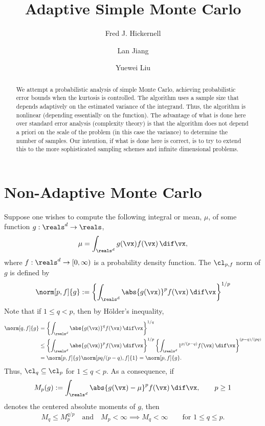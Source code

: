 \documentclass[12pt]{amsart}
\begin{document}
\title{Adaptive Simple Monte Carlo}
\author{Fred J. Hickernell}
\author{Lan Jiang}
\author{Yuewei Liu}
\begin{abstract}We attempt a probabilistic analysis of simple Monte Carlo, achieving probabilistic error bounds when the kurtosis is controlled.  The algorithm uses a sample size that depends adaptively on the estimated variance of the integrand.  Thus, the algorithm is nonlinear (depending essentially on the function).  The advantage of what is done here over standard error analysis (complexity theory) is that the algorithm does not depend a priori on the scale of the problem (in this case the variance) to determine the number of samples.   Our intention, if what is done here is correct, is to try to extend this to the more sophisticated sampling schemes and infinite dimensional problems.
\end{abstract}
\maketitle

\section{Non-Adaptive Monte Carlo}
Suppose one wishes to compute the following integral or mean, $\mu$, of some function $g: \reals^d \to \reals$,
\begin{equation*}
\mu= \int_{\reals^d} g(\vx) f(\vx) \, \dif \vx,
\end{equation*}
where $f: \reals^d \to [0,\infty)$ is a probability density function.  The $\cl_{p,f}$ norm of $g$ is defined by
\[
\norm[p,f]{g} :=\left\{\int_{\reals^d} \abs{g(\vx)}^p f(\vx) \, \dif \vx\right\}^{1/p}
\]
Note that if $1 \le q<p$, then by H\"older's inequality,
\begin{align}\label{LP}
\norm[q,f]{g} &=\left\{\int_{\reals^d} \abs{g(\vx)}^q f(\vx) \, \dif \vx\right\}^{1/q}\\
\nonumber & \le \left\{\int_{\reals^d} \abs{g(\vx)}^p f(\vx) \, \dif \vx \right\}^{1/p} \left\{\int_{\reals^d} 1^{p/(p-q)} f(\vx) \, \dif \vx\right\}^{(p-q)/(pq)} \\
\nonumber & = \norm[p,f]{g} \norm[pq/(p-q),f]{1} = \norm[p,f]{g}.
\end{align}
Thus, $\cl_q \subseteq \cl_p$ for $1 \le q<p$.  As a consequence, if
\begin{equation} \label{momentdef}
M_p(g) := \int_{\reals^d} \abs{g(\vx)-\mu}^p f(\vx) \, \dif \vx, \qquad p \ge 1
\end{equation}
denotes the centered absolute moments of $g$, then
\begin{equation}\label{Mineq}
M_q \le M_p^{q/p} \quad \text{and} \quad M_p < \infty \implies M_q <\infty \qquad \text{for }1 \le q \le p.
\end{equation}
\end{document}
